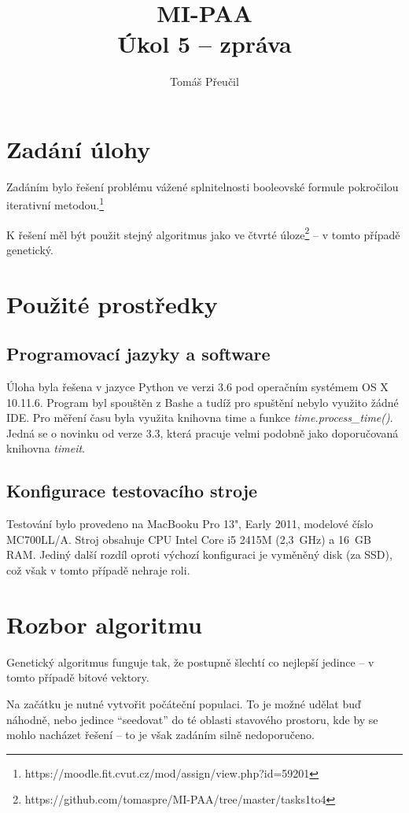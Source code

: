 \documentclass[a4paper]{article}
\title{MI-PAA\\
\large Úkol 5 -- zpráva\\}
\author{Tomáš Přeučil}
\begin{document}
\maketitle


\section{Zadání úlohy}
	Zadáním bylo řešení problému vážené splnitelnosti booleovské formule pokročilou iterativní metodou.\footnote{https://moodle.fit.cvut.cz/mod/assign/view.php?id=59201}

	K řešení měl být použit stejný algoritmus jako ve čtvrté úloze\footnote{https://github.com/tomaspre/MI-PAA/tree/master/tasks1to4} -- v tomto případě genetický.


\section{Použité prostředky}
	\subsection{Programovací jazyky a software}
		Úloha byla řešena v jazyce Python ve verzi 3.6 pod operačním systémem OS X 10.11.6. Program byl spouštěn z Bashe a tudíž pro spuštění nebylo využito žádné IDE.
		Pro měření času byla využita knihovna time a funkce \textit{time.process\_time()}. Jedná se o novinku od verze 3.3, která pracuje velmi podobně jako doporučovaná knihovna \textit{timeit}.
		
	\subsection{Konfigurace testovacího stroje}
		Testování bylo provedeno na MacBooku Pro 13", Early 2011, modelové číslo MC700LL/A. Stroj obsahuje CPU Intel Core i5 2415M (2,3~GHz) a 16~GB RAM. Jediný další rozdíl oproti výchozí konfiguraci je vyměněný disk (za SSD), což však v tomto případě nehraje roli.

\section{Rozbor algoritmu}
	Genetický algoritmus funguje tak, že postupně šlechtí co nejlepší jedince -- v tomto případě bitové vektory.
	
	Na začátku je nutné vytvořit počáteční populaci. To je možné udělat buď náhodně, nebo jedince \enquote{seedovat} do té oblasti stavového prostoru, kde by se mohlo nacházet řešení -- to je však zadáním silně nedoporučeno.
	
\end{document}
